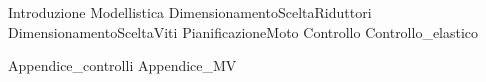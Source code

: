 \documentclass{miaclasse}
\begin{document}
\primapag

\pagestyle{fancy}







{Introduzione}
{Modellistica}
{DimensionamentoSceltaRiduttori}
{DimensionamentoSceltaViti}
{PianificazioneMoto}
{Controllo}
{Controllo_elastico}

\appendix
{Appendice_controlli}
{Appendice_MV}
\end{document}
